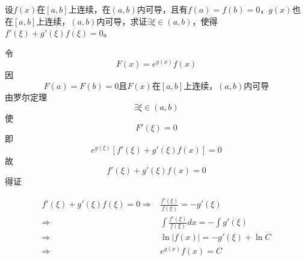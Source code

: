 \begin{example}
	设$f(x)$在$[a,b]$上连续，在$(a,b)$内可导，且有$f(a)=f(b)=0$，$g(x)$也在$[a,b]$上连续，$(a,b)$内可导，求证$\exists\xi\in(a,b)$，使得$f'(\xi)+g'(\xi)f(\xi)=0$。
\end{example}
	\begin{newproof}
		令\[F\left( x \right) =e^{g\left( x \right)}f\left( x \right) \]
		因\[F\left( a \right) =F\left( b \right) =\text{0且}F\left( x \right) \text{在}\left[ a,b \right] \text{上连续，}\left( a,b \right) \text{内可导}\]
		由罗尔定理\[\exists \xi \in \left( a,b \right) \]
		使\[F'\left( \xi \right) =0\]
		即\[e^{g\left( \xi \right)}\left[ f'\left( \xi \right) +g'\left( \xi \right) f\left( x \right) \right] =0\]
		故\[f'\left( \xi \right) +g'\left( \xi \right) f\left( x \right) =0\]
		得证
	\end{newproof}
	\begin{note}
		\begin{align*}
			f'\left( \xi \right) +g'\left( \xi \right) f\left( \xi \right) =0
			\Longrightarrow {}&
			\frac{f'\left( \xi \right)}{f\left( \xi \right)}=-g'\left( \xi \right) \\
			\Longrightarrow {}&
			\int{\frac{f'\left( \xi \right)}{f\left( \xi \right)}dx=-\int{g'\left( \xi \right)}}\\
			\Longrightarrow {}&
			\ln \left| f\left( x \right) \right|=-g'\left( \xi \right) +\ln C\\
			\Longrightarrow {}&
			e^{g\left( x \right)}f\left( x \right) =C
		\end{align*}
	\end{note}

